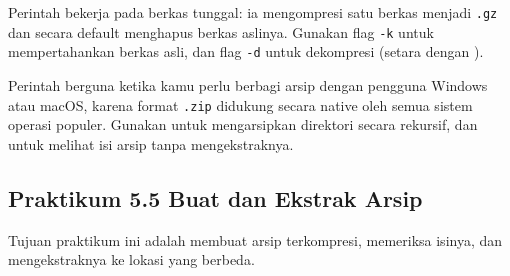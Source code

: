 Perintah  bekerja pada berkas tunggal: ia mengompresi satu berkas menjadi
\texttt{.gz} dan secara default menghapus berkas aslinya. Gunakan flag \texttt{-k} untuk
mempertahankan berkas asli, dan flag \texttt{-d} untuk dekompresi (setara dengan ).

Perintah  berguna ketika kamu perlu berbagi arsip dengan pengguna Windows atau
macOS, karena format \texttt{.zip} didukung secara native oleh semua sistem operasi populer.
Gunakan  untuk mengarsipkan direktori secara rekursif, dan 
untuk melihat isi arsip tanpa mengekstraknya.

\subsection*{Praktikum 5.5 Buat dan Ekstrak Arsip}

Tujuan praktikum ini adalah membuat arsip terkompresi, memeriksa isinya, dan mengekstraknya
ke lokasi yang berbeda.

